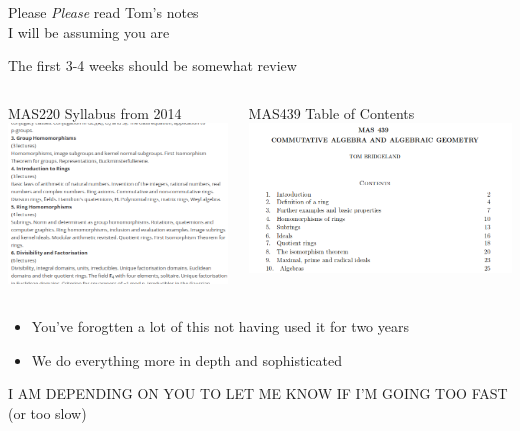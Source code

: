 \documentclass{beamer}
\begin{document}
\begin{frame}[plain,c]

\begin{center}

\Huge

Please \emph{Please} read Tom's notes \\
I will be assuming you are
\end{center}

\end{frame}




\begin{frame}{The first 3-4 weeks should be somewhat review}

\begin{columns}
\begin{block}{MAS220 Syllabus from 2014}
 \includegraphics[width=.9\linewidth]{MAS220}
\end{block}
\begin{block}{MAS439 Table of Contents}
\includegraphics[width=.9\linewidth]{TOC}
\end{block}
\end{columns}
\begin{itemize}
\item You've forogtten a lot of this not having used it for two years
\item We do everything more in depth and sophisticated
\end{itemize}
\alert{I AM DEPENDING ON YOU TO LET ME KNOW IF I'M GOING TOO FAST} (or too slow)

\end{frame}
\end{document}
